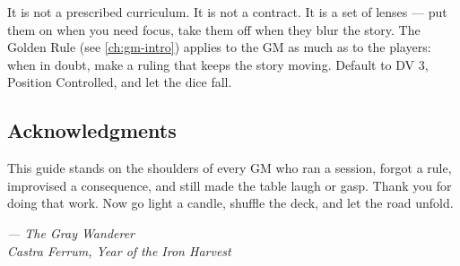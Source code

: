 It is not a prescribed curriculum. It is not a contract. It is a set of lenses --- put them on when you need focus, take them off when they blur the story. The Golden Rule (see \autoref{ch:gm-intro}) applies to the GM as much as to the players: when in doubt, make a ruling that keeps the story moving. Default to DV 3, Position Controlled, and let the dice fall.

\subsection*{Acknowledgments}

This guide stands on the shoulders of every GM who ran a session, forgot a rule, improvised a consequence, and still made the table laugh or gasp. Thank you for doing that work. Now go light a candle, shuffle the deck, and let the road unfold.

\vspace{1em}
\noindent\textit{--- The Gray Wanderer} \\
\textit{Castra Ferrum, Year of the Iron Harvest}